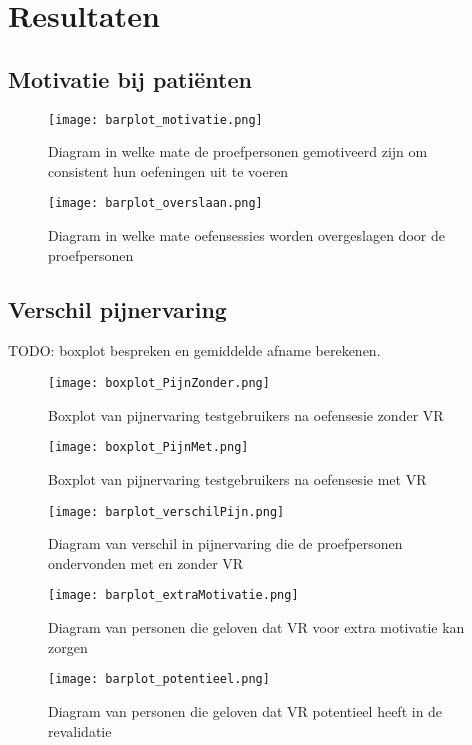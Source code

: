 \section{Resultaten}

\subsection{Motivatie bij patiënten}

\begin{figure}[h]
    \centering
    \texttt{[image: barplot\_motivatie.png]}
    \caption{Diagram in welke mate de proefpersonen gemotiveerd zijn om consistent hun oefeningen uit te voeren}
\end{figure}

\begin{figure}[h]
    \centering
    \texttt{[image: barplot\_overslaan.png]}
    \caption{Diagram in welke mate oefensessies worden overgeslagen door de proefpersonen}
\end{figure}

\newpage

\subsection{Verschil pijnervaring}

TODO: boxplot bespreken en gemiddelde afname berekenen.

\begin{figure}[h]
    \centering
    \texttt{[image: boxplot\_PijnZonder.png]}
    \caption{Boxplot van pijnervaring testgebruikers na oefensesie zonder VR}
\end{figure}

\begin{figure}[h]
    \centering
    \texttt{[image: boxplot\_PijnMet.png]}
    \caption{Boxplot van pijnervaring testgebruikers na oefensesie met VR}
\end{figure}

\begin{figure}
    \centering
    \texttt{[image: barplot\_verschilPijn.png]}
    \caption{Diagram van verschil in pijnervaring die de proefpersonen ondervonden met en zonder VR}
\end{figure}

\begin{figure}
    \centering
    \texttt{[image: barplot\_extraMotivatie.png]}
    \caption{Diagram van personen die geloven dat VR voor extra motivatie kan zorgen}
\end{figure}

\begin{figure}
    \centering
    \texttt{[image: barplot\_potentieel.png]}
    \caption{Diagram van personen die geloven dat VR potentieel heeft in de revalidatie}
\end{figure}




